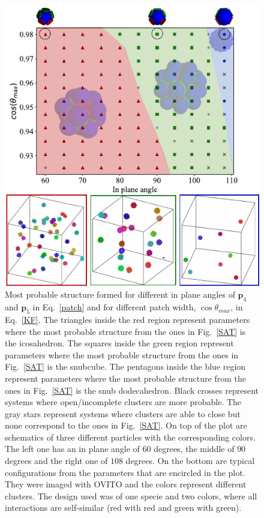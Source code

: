 \documentclass[a4paper, amsfonts, amssymb, amsmath, reprint, showkeys, nofootinbib, twoside]{revtex4-1}
\begin{document}
\begin{figure}[t]
	\includegraphics{fig3.pdf}
	\caption{\label{N1c2} Most probable structure formed for different in plane angles of $\textbf{p}_4$ and $\textbf{p}_5$ in Eq.~\ref{patch} and for different patch width, $\cos\theta_{max}$, in Eq.~\ref{KF}. The triangles inside the red region represent parameters where the most probable structure from the ones in Fig.~\ref{SAT} is the icosahedron. The squares inside the green region represent parameters where the most probable structure from the ones in Fig.~\ref{SAT} is the snubcube. The pentagons inside the blue region represent parameters where the most probable structure from the ones in Fig.~\ref{SAT} is the snub dodecahedron. Black crosses represent systems where open/incomplete clusters are more probable. The gray stars represent systems where clusters are able to close but none correspond to the ones in Fig.~\ref{SAT}. On top of the plot are schematics of three different particles with the corresponding colors. The left one has an in plane angle of $60$ degrees, the middle of $90$ degrees and the right one of $108$ degrees. On the bottom are typical configurations from the parameters that are encircled in the plot. They were imaged with OVITO and the colors represent different clusters. The design used was of one specie and two colors, where all interactions are self-similar (red with red and green with green).}
\end{figure}
\end{document}
